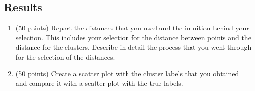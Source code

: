 \documentclass{article}
\begin{document}
\subsection{Results}
\begin{enumerate}[a]
\item (50 points) Report the distances that you used and the intuition behind your selection. This includes your selection for the distance between points and the distance for the clusters. Describe in detail the process that you went through for the selection of the distances.
\item (50 points) Create a scatter plot with the cluster labels that you obtained and compare it with a scatter plot with the true labels.

\end{enumerate}
\end{document}
